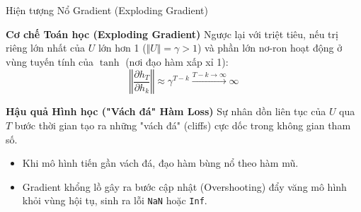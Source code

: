 \documentclass[aspectratio=169, 10pt]{beamer}
\begin{document}
\begin{frame}{Hiện tượng Nổ Gradient (Exploding Gradient)}
\small
\begin{alertblock}{\textbf{Cơ chế Toán học (Exploding Gradient)}}
Ngược lại với triệt tiêu, nếu trị riêng lớn nhất của $U$ lớn hơn 1 ($\Vert U \Vert = \gamma > 1$) và phần lớn nơ-ron hoạt động ở vùng tuyến tính của $\tanh$ (nơi đạo hàm xấp xỉ 1):
\[ \left\Vert \frac{\partial h_T}{\partial h_k} \right\Vert \approx \gamma^{T-k} \xrightarrow{T-k \to \infty} \infty \]
\end{alertblock}

\vspace{0.1cm}
\begin{block}{\textbf{Hậu quả Hình học ("Vách đá" Hàm Loss)}}
Sự nhân dồn liên tục của $U$ qua $T$ bước thời gian tạo ra những "vách đá" (cliffs) cực dốc trong không gian tham số. 
\begin{itemize}
    \item Khi mô hình tiến gần vách đá, đạo hàm bùng nổ theo hàm mũ.
    \item Gradient khổng lồ gây ra bước cập nhật (Overshooting) đẩy văng mô hình khỏi vùng hội tụ, sinh ra lỗi \texttt{NaN} hoặc \texttt{Inf}.
\end{itemize}
\end{block}
\end{frame}
\end{document}
